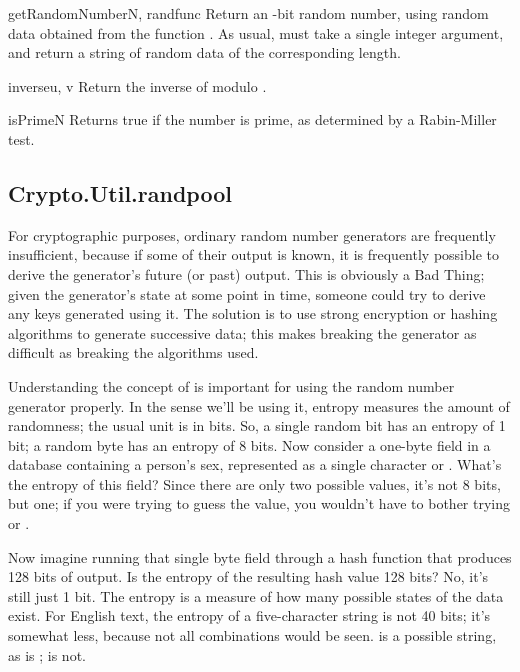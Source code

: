 \documentclass{howto}
\begin{document}
\begin{funcdesc}{getRandomNumber}{N, randfunc}
Return an -bit random number, using random data obtained from the
function .  As usual,  must take a single
integer argument, and return a string of random data of the
corresponding length.
\end{funcdesc}

\begin{funcdesc}{inverse}{u, v}
Return the inverse of  modulo .
\end{funcdesc}

\begin{funcdesc}{isPrime}{N}
Returns true if the number  is prime, as determined by a
Rabin-Miller test.
\end{funcdesc}

\subsection{Crypto.Util.randpool}
For cryptographic purposes, ordinary random number generators are
frequently insufficient, because if some of their output is known, it is
frequently possible to derive the generator's future (or past) output.
This is obviously a Bad Thing; given the generator's state at some point
in time, someone could try to derive any keys generated using it.  The
solution is to use strong encryption or hashing algorithms to generate
successive data; this makes breaking the generator as difficult as
breaking the algorithms used.

Understanding the concept of  is important for using the
random number generator properly.  In the sense we'll be using it,
entropy measures the amount of randomness; the usual unit is in bits.
So, a single random bit has an entropy of 1 bit; a random byte has an
entropy of 8 bits.  Now consider a one-byte field in a database containing a
person's sex, represented as a single character  or .
What's the entropy of this field?  Since there are only two possible
values, it's not 8 bits, but one; if you were trying to guess the value,
you wouldn't have to bother trying  or .  

Now imagine running that single byte field through a hash function that
produces 128 bits of output.  Is the entropy of the resulting hash value
128 bits?  No, it's still just 1 bit.  The entropy is a measure of how many
possible states of the data exist.  For English
text, the entropy of a five-character string is not 40 bits; it's
somewhat less, because not all combinations would be seen.  
is a possible string, as is ;  is not.
\end{document}
